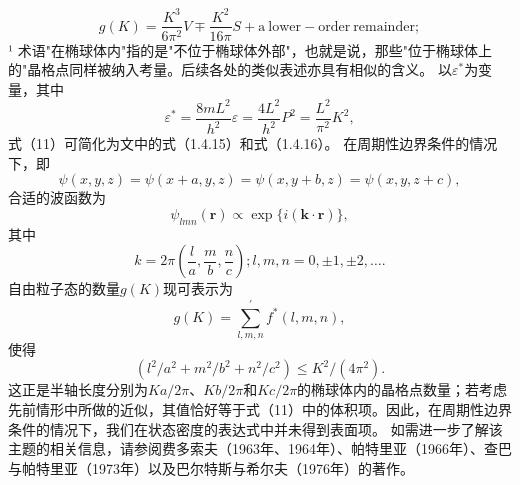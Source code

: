 \begin{equation}\tag{17.1.11}\label{eq:17.1.11}
g ( K ) = \frac { K ^{3} } { 6 \pi ^{2} } V \mp \frac { K ^{2} } { 16 \pi } S + \mathrm { a ~ l o w e r - o r d e r ~ r e m a i n d e r } ;
\end{equation}
¹ 术语"在椭球体内"指的是"不位于椭球体外部"，也就是说，那些"位于椭球体上的"晶格点同样被纳入考量。后续各处的类似表述亦具有相似的含义。
以\(\varepsilon^{*}\)为变量，其中
\begin{equation}\tag{17.1.12}\label{eq:17.1.12}
\varepsilon ^{*} = \frac { 8 m L ^{2} } { h ^{2} } \varepsilon = \frac { 4 L ^{2} } { h ^{2} } P ^{2} = \frac { L ^{2} } { \pi ^{2} } K ^{2} ,
\end{equation}
式（11）可简化为文中的式（1.4.15）和式（1.4.16）。
在周期性边界条件的情况下，即
\begin{equation}\tag{17.1.13}\label{eq:17.1.13}
\psi ( x , y , z ) = \psi ( x + a , y , z ) = \psi ( x , y + b , z ) = \psi ( x , y , z + c ) ,
\end{equation}
合适的波函数为
\begin{equation}\tag{17.1.14}\label{eq:17.1.14}
\psi _ { l m n } ( \mathbf { r } ) \propto \exp \{ i ( \mathbf { k } \cdot \mathbf { r } ) \} ,
\end{equation}
其中
\begin{equation}\tag{17.1.15}\label{eq:17.1.15}
k = 2 \pi \left( { \frac { l } { a } } , { \frac { m } { b } } , { \frac { n } { c } } \right) ;  l , m , n = 0 , \pm 1 , \pm 2 , \ldots .
\end{equation}
自由粒子态的数量\(g(K)\)现可表示为
\begin{equation}\tag{17.1.16}\label{eq:17.1.16}
g ( K ) = \sum _ { l , m , n } ^{\prime} f ^{*} ( l , m , n ) ,
\end{equation}
使得
\begin{equation}\tag{17.1.17}\label{eq:17.1.17}
( l ^{2} / a ^{2} + m ^{2} / b ^{2} + n ^{2} / c ^{2} ) \leq K ^{2} / ( 4 \pi ^{2} ) .
\end{equation}
这正是半轴长度分别为\(Ka/2\pi\)、\(Kb/2\pi\)和\(Kc/2\pi\)的椭球体内的晶格点数量；若考虑先前情形中所做的近似，其值恰好等于式（11）中的体积项。因此，在周期性边界条件的情况下，我们在状态密度的表达式中并未得到表面项。
如需进一步了解该主题的相关信息，请参阅费多索夫（1963年、1964年）、帕特里亚（1966年）、查巴与帕特里亚（1973年）以及巴尔特斯与希尔夫（1976年）的著作。
